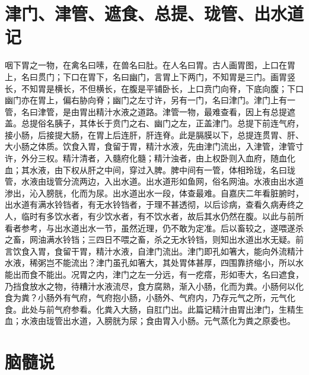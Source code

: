 \documentclass[a4paper,12pt,UTF8,twoside]{ctexbook}
\begin{document}
	\chapter{津门、津管、遮食、总提、珑管、出水道记}
	咽下胃之一物，在禽名曰嗉，在兽名曰肚。在人名曰胃。古人画胃图，上口在胃上，名曰贯门；下口在胃下，名曰幽门，言胃上下两门，不知胃是三门。画胃竖长，不知胃是横长，不但横长，在腹是平铺卧长，上口贲门向脊，下底向腹；下口幽门亦在胃上，偏右胁向脊；幽门之左寸许，另有一门，名曰津门。津门上有一管，名曰津管，是由胃出精汁水液之道路。津管一物，最难查看，因上有总提遮盖。总提俗名胰子，其体长于贲门之右、幽门之左，正盖津门。总提下前连气府，接小肠，后接提大肠，在胃上后连肝，肝连脊。此是膈膜以下，总提连贯胃、肝、大小肠之体质。饮食入胃，食留于胃，精汁水液，先由津门流出，入津管，津管寸许，外分三权。精汁清者，入髓府化髓；精汁浊者，由上权卧则入血府，随血化血；其水液，由下权从肝之中间，穿过入脾。脾中间有一管，体相玲珑，名曰珑管，水液由珑管分流两边，入出水道。出水道形如鱼网，俗名网油。水液由出水道渗出，沁入膀胱，化而为尿。出水道出水一段，体查最难。自嘉庆二年看脏腑时，出水道有满水铃铛者，有无水铃铛者，于理不甚透彻，以后诊病，查看久病寿终之人，临时有多饮水者，有少饮水者，有不饮水者，故后其水仍然在腹。以此与前所看者参考，与出水道出水一节，虽然近理，仍不敢为定准。后以畜较之，遂喂遂杀之畜，网油满水铃铛；三四日不喂之畜，杀之无水铃铛，则知出水道出水无疑。前言饮食入胃，食留干胃，精汁水液，自津门流出。津门即孔如箸大，能向外流精汁水液，稀粥岂不能流出？津门虽孔如箸大，其处胃体甚厚，四围靠挤缩小，所以水能出而食不能出。况胃之内，津门之左一分远，有一疙瘩，形如枣大，名曰遮食，乃挡食放水之物，待糟汁水液流尽，食方腐熟，渐入小肠，化而为粪。小肠何以化食为粪？小肠外有气府，气府抱小肠，小肠外、气府内，乃存元气之所，元气化食。此处与前气府参看。化粪入大肠，自肛门出。此篇记精汁由胃出津门，生精生血；水液由珑管出水道，入膀胱为尿；食由胃入小肠。元气蒸化为粪之原委也。
	
	\chapter{脑髓说}
	
\end{document}
